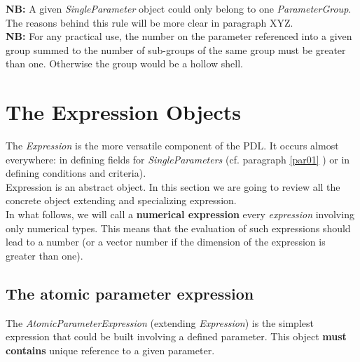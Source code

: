 \documentclass[11pt]{amsart}
\begin{document}
{\bf NB:} A given {\it SingleParameter} object could only belong to one {\it ParameterGroup}. The reasons behind this rule will be more clear in paragraph XYZ.\\

{\bf NB:}  For any practical use, the number on the parameter referenced into a given group summed to the number of sub-groups of the same group must be greater than one. Otherwise the group would be a hollow shell.




\section{The Expression Objects}\label{par02}
The {\it Expression} is the more versatile component of the PDL. It occurs almost everywhere: in defining fields for {\it SingleParameters} (cf. paragraph \ref{par01} ) or in defining conditions and criteria).\\
Expression is an abstract object. In this section we are going to review all the concrete object extending and specializing expression.\\

 In what follows, we will call a {\bf numerical expression} every {\it expression} involving only numerical types. This means that the evaluation of such expressions should lead to a number (or a vector number if the dimension of the expression is greater than one).\\


\subsection{The atomic parameter expression}\label{par02_01}
The {\it AtomicParameterExpression} (extending {\it Expression}) is the simplest expression that could be built involving a defined parameter. This object {\bf must contains} unique reference to a given parameter.\\
\end{document}
